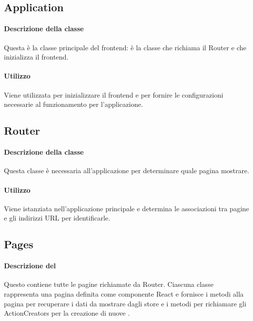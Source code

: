 \subsection{Application}
\paragraph*{Descrizione della classe}
Questa è la classe principale del frontend: è la classe che richiama il Router e che inizializza il frontend.
\paragraph*{Utilizzo}
Viene utilizzata per inizializzare il frontend e per fornire le configurazioni necessarie al funzionamento per l'applicazione.

\subsection{Router}
\paragraph*{Descrizione della classe}
Questa classe è necessaria all'applicazione per determinare quale pagina mostrare.
\paragraph*{Utilizzo}
Viene istanziata nell'applicazione principale e determina le associazioni tra pagine e gli indirizzi URL per identificarle.

\subsection{Pages}
\paragraph*{Descrizione del }
Questo  contiene tutte le pagine richiamate da Router. Ciascuna classe rappresenta una pagina definita come componente React e fornisce i metodi alla pagina per recuperare i dati da mostrare dagli store e i metodi per richiamare gli ActionCreators per la creazione di nuove .
